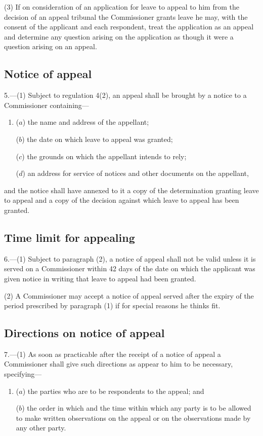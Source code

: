 \documentclass[12pt,a4paper]{article}
\begin{document}
(3) If on consideration of an application for leave to appeal to him from the decision of an appeal tribunal the Commissioner grants leave he may, with the consent of the applicant and each respondent, treat the application as an appeal and determine any question arising on the application as though it were a question arising on an appeal.

\subsection[5. Notice of appeal]{Notice of appeal}

5.—(1) Subject to regulation 4(2), an appeal shall be brought by a notice to a Commissioner containing—
\begin{enumerate}\item[]
($a$) the name and address of the appellant;

($b$) the date on which leave to appeal was granted;

($c$) the grounds on which the appellant intends to rely;

($d$) an address for service of notices and other documents on the appellant,
\end{enumerate}
and the notice shall have annexed to it a copy of the determination granting leave to appeal and a copy of the decision against which leave to appeal has been granted.

\subsection[6. Time limit for appealing]{Time limit for appealing}

6.—(1) Subject to paragraph (2), a notice of appeal shall not be valid unless it is served on a Commissioner within 42 days of the date on which the applicant was given notice in writing that leave to appeal had been granted.

(2) A Commissioner may accept a notice of appeal served after the expiry of the period prescribed by paragraph (1) if for special reasons he thinks fit.

\subsection[7. Directions on notice of appeal]{Directions on notice of appeal}

7.—(1) As soon as practicable after the receipt of a notice of appeal a Commissioner shall give such directions as appear to him to be necessary, specifying—
\begin{enumerate}\item[]
($a$) the parties who are to be respondents to the appeal; and

($b$) the order in which and the time within which any party is to be allowed to make written observations on the appeal or on the observations made by any other party.
\end{enumerate}
\end{document}
